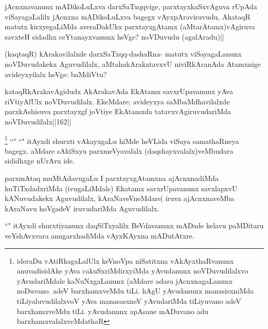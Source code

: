 \begin{artha}
jAcnxnavanunx mADikoLuLxva darxSaTxqqvige, parxtayxkaSxvAguva rUpAda viSayagaLalilx jAcnxna mADikoLuLxva bagegx vAyxpAraviruvudu, AkataqR matutx kirxyegaLiMda averaDakUkx parxtayxgAtamx (aMtarAtamx)vAgiruva savxteH sidadhx ceYtanayxvanunx heVge? noVDuvudu (agalAradu)||
\end{artha}

\begin{artha}
(kaqtaqR) kArakavilalxde darxSaTxqq-dashaRna- matutx viSayagaLanunx noVDuvudakekx Aguvudilalx, aMtahakArakatavxvU niviRkAranAda Atamxnige avideyxyilalx heVge: baMdiVtu?
\end{artha}

\begin{artha}
kataqRkArakavAgidudx AkArakavAda EkAtamx savxrUpavanunx yAva riVtiyAlUlx noVDuvudilalx. EkeMdare; avideyxya saMbaMdhavilalxde parxkAshisuva parxtayxgf joVtiye EkAtamxda tatavxvAgiruvudariMda noVDuvudilalx||162||
\end{artha}

\begin{artha}%
\footnote[1]{ideraDu vAtiRkagaLalUlx keVnoVpa niSatitxna vAkAyxthaRvanunx anuvadisidAke yAva cakuSxriMdirxyiMda yAvudanunx noVDuvudilalxvo yAvudariMdale kaNuNxgaLanunx (aMdare adara jAcnxnagaLanunx noDuvano. adeV barxhamxveMdu tiLi. hAgU yAvudanunx manasisxniMda tiLiyaluvudilalxvoV yAva manasasxneV yAvudariMda tiLiyuvano adeV barxhamxveMdu tiLi. yAvudanunx apAsane mADuvano adu barxhamxvalalxveMdathaR} ``\stext " ``\stext " itAyxdi shurxti vAkayxgaLu hiMde heVLida viSaya samathaRneya bagegx. aMdare sAkiSxyu parxmeVyavalalx (daqshayxvalalx)veMbudara sididhxge nUrAru ide.
\end{artha}

\begin{artha}
parxmAtaq muMtAdavugaLu I parxtayxgAtamxna ajAcnxnadiMda huTiTxdadxriMda (ivugaLiMdale) Ekatamx savxrUpavanunx savxlapxvU kANuvudakekx Aguvudilalx, kAraNaveVneMdare| iruva ajAcnxnaveMba kAraNavu hoVgadeV iruvudariMda Aguvudilalx. 
\end{artha}


\begin{artha}
``\stext " itAyxdi shurxtiyanunx daqSiTxyalilx BeVdavanunx mADade kelavu paMDitaru veYshAvxvara anugarxhadiMda vAyxKAyxna mADutAtxre.
\end{artha}%

